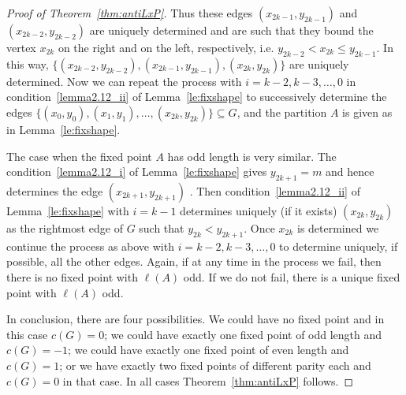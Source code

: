 \documentclass[ALCO,ThmDefs,Unicode,epreuves]{cedram}
\begin{document}
\begin{proof}[Proof of Theorem~\ref{thm:antiLxP}]
 Thus these edges $(x_{2k-1},y_{2k-1})$ and $(x_{2k-2},y_{2k-2})$ are uniquely determined and are such that they bound the vertex $x_{2k}$ on the right and on the left, respectively, i.e. $y_{2k-2}<x_{2k}\le y_{2k-1}$.
In this way, $\big\{(x_{2k-2},y_{2k-2}),(x_{2k-1},y_{2k-1}),(x_{2k},y_{2k})\big\}$ are uniquely determined.
 Now we can repeat the process with $i=k-2, k-3,\ldots,0$ in condition~\ref{lemma2.12_ii} 
 of Lemma~\ref{le:fixshape} to successively determine the edges $\big\{(x_0,y_0),(x_1,y_1),\ldots,(x_{2k},y_{2k})\big\}\subseteq G$, and the partition $A$ is given as in Lemma~\ref{le:fixshape}. 
 
 The case when the fixed point $A$ has odd length is very similar. The condition~\ref{lemma2.12_i} of Lemma~\ref{le:fixshape} gives $y_{2k+1}=m$ and hence determines the edge $(x_{2k+1},y_{2k+1})$ . 
Then condition~\ref{lemma2.12_ii} of Lemma~\ref{le:fixshape} with $i=k-1$ determines uniquely (if it exists) $(x_{2k},y_{2k})$ as the rightmost edge of $G$ such that $y_{2k}<y_{2k+1}$. Once $x_{2k}$ is determined
we continue the process as above with $i=k-2, k-3,\ldots,0$ to determine uniquely, if possible, all the other edges. Again, if at any time in the process we fail, then there is no fixed point with $\ell(A)$ odd. If we do not fail, there is a unique fixed point with $\ell(A)$ odd.

In conclusion, there are four possibilities. We could have no fixed point and in this case $c(G)=0$; we could have exactly one fixed point of odd length and $c(G)=-1$; we could have exactly one fixed point of even length and $c(G)=1$; or we have exactly two fixed points of different parity each and $c(G)=0$ in that case. In all cases Theorem~\ref{thm:antiLxP} follows. 
\end{proof}
\end{document}
